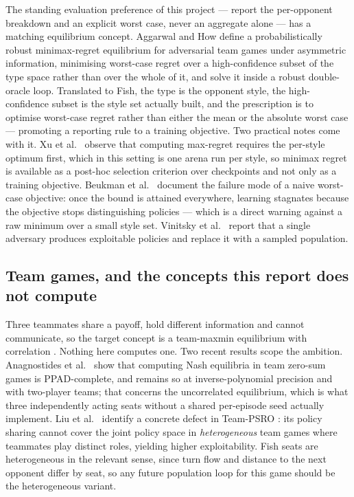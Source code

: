 The standing evaluation preference of this project --- report the per-opponent
breakdown and an explicit worst case, never an aggregate alone --- has a matching
equilibrium concept. Aggarwal and How \cite{aggarwal-prmre} define a
probabilistically robust minimax-regret equilibrium for adversarial team games
under asymmetric information, minimising worst-case regret over a
high-confidence subset of the type space rather than over the whole of it, and
solve it inside a robust double-oracle loop. Translated to Fish, the type is the
opponent style, the high-confidence subset is the style set actually built, and
the prescription is to optimise worst-case regret rather than either the mean or
the absolute worst case --- promoting a reporting rule to a training objective.
Two practical notes come with it. Xu et al.\ \cite{xu-mirror} observe that
computing max-regret requires the per-style optimum first, which in this setting
is one arena run per style, so minimax regret is available as a post-hoc
selection criterion over checkpoints and not only as a training objective.
Beukman et al.\ \cite{beukman-remidi} document the failure mode of a naive
worst-case objective: once the bound is attained everywhere, learning stagnates
because the objective stops distinguishing policies --- which is a direct warning
against a raw minimum over a small style set. Vinitsky et al.\
\cite{vinitsky-rap} report that a single adversary produces exploitable policies
and replace it with a sampled population.

\subsection{Team games, and the concepts this report does not compute}

Three teammates share a payoff, hold different information and cannot
communicate, so the target concept is a team-maxmin equilibrium with correlation
\cite{celli-gatti}. Nothing here computes one. Two recent results scope the
ambition. Anagnostides et al.\ \cite{anagnostides-teamzero} show that computing
Nash equilibria in team zero-sum games is PPAD-complete, and remains so at
inverse-polynomial precision and with two-player teams; that concerns the
uncorrelated equilibrium, which is what three independently acting seats without
a shared per-episode seed actually implement. Liu et al.\ \cite{liu-hpsro}
identify a concrete defect in Team-PSRO \cite{mcaleer-teampsro}: its policy
sharing cannot cover the joint policy space in \emph{heterogeneous} team games
where teammates play distinct roles, yielding higher exploitability. Fish seats
are heterogeneous in the relevant sense, since turn flow and distance to the next
opponent differ by seat, so any future population loop for this game should be
the heterogeneous variant.

